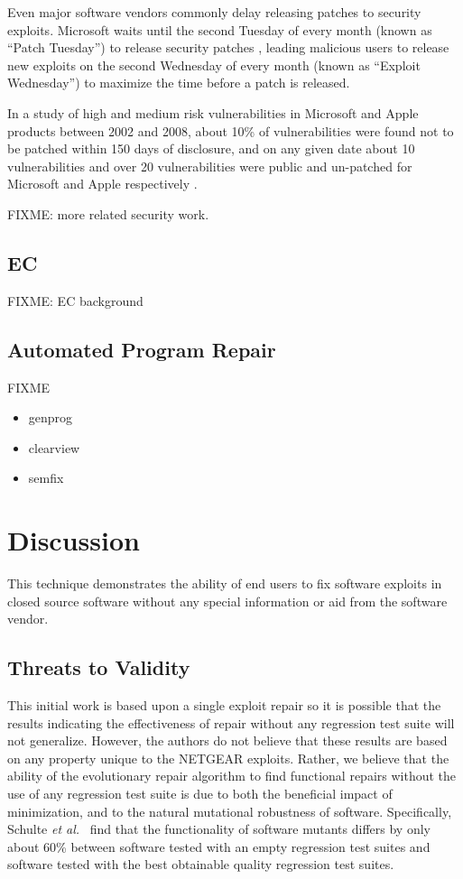 \documentclass{sigcomm-alternate}
\begin{document}
{Even major software vendors commonly delay releasing patches to
security exploits.  Microsoft waits until the second Tuesday of every
month (known as ``Patch Tuesday'') to release security patches
\cite{lemos2003microsoft}, leading malicious users to release new
exploits on the second Wednesday of every month (known as ``Exploit
Wednesday'') to maximize the time before a patch is released.

In a study of high and medium risk vulnerabilities in Microsoft and
Apple products between 2002 and 2008, about 10\% of
vulnerabilities were found not to be patched within 150 days of
disclosure, and on any given date about 10 vulnerabilities and over 20
vulnerabilities were public and un-patched for Microsoft and Apple
respectively \cite{frei20080}.

FIXME: more related security work.

\subsection{EC}
\label{sec-5-2}

FIXME: EC background

\subsection{Automated Program Repair}
\label{sec-5-3}

FIXME

\begin{itemize}
\item genprog
\item clearview
\item semfix
\end{itemize}

\section{Discussion}
\label{sec-6}
This technique demonstrates the ability of end users to fix software
exploits in closed source software without any special information or
aid from the software vendor.

\subsection{Threats to Validity}
\label{sec-6-1}
This initial work is based upon a single exploit repair so it is
possible that the results indicating the effectiveness of repair
without any regression test suite will not generalize.  However, the
authors do not believe that these results are based on any property
unique to the NETGEAR exploits. Rather, we believe that the ability of
the evolutionary repair algorithm to find functional repairs without
the use of any regression test suite is due to both the beneficial
impact of minimization, and to the natural mutational robustness of
software. Specifically, Schulte \emph{et al.}~\cite{schulte2013software} 
find that the functionality of software mutants differs by only about 60\%
between software tested with an empty regression test suites and software
tested with the best obtainable quality regression test suites.

}
\end{document}
